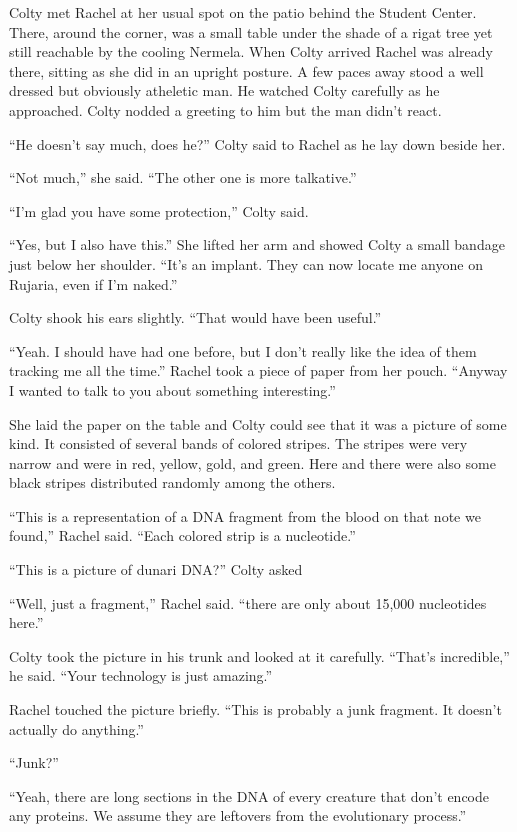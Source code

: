 
Colty met Rachel at her usual spot on the patio behind the Student Center. There, around the
corner, was a small table under the shade of a rigat tree yet still reachable by the cooling
Nermela. When Colty arrived Rachel was already there, sitting as she did in an upright posture.
A few paces away stood a well dressed but obviously atheletic man. He watched Colty carefully as
he approached. Colty nodded a greeting to him but the man didn't react.

``He doesn't say much, does he?'' Colty said to Rachel as he lay down beside her.

``Not much,'' she said. ``The other one is more talkative.''

``I'm glad you have some protection,'' Colty said.

``Yes, but I also have this.'' She lifted her arm and showed Colty a small bandage just below
her shoulder. ``It's an implant. They can now locate me anyone on Rujaria, even if I'm naked.''

Colty shook his ears slightly. ``That would have been useful.''

``Yeah. I should have had one before, but I don't really like the idea of them tracking me all
the time.'' Rachel took a piece of paper from her pouch. ``Anyway I wanted to talk to you about
something interesting.''

She laid the paper on the table and Colty could see that it was a picture of some kind. It
consisted of several bands of colored stripes. The stripes were very narrow and were in red,
yellow, gold, and green. Here and there were also some black stripes distributed randomly among
the others.

``This is a representation of a DNA fragment from the blood on that note we found,'' Rachel
said. ``Each colored strip is a nucleotide.''

``This is a picture of dunari DNA?'' Colty asked

``Well, just a fragment,'' Rachel said. ``there are only about 15,000 nucleotides here.''

Colty took the picture in his trunk and looked at it carefully. ``That's incredible,'' he said.
``Your technology is just amazing.''

Rachel touched the picture briefly. ``This is probably a junk fragment. It doesn't actually do
anything.''

``Junk?''

``Yeah, there are long sections in the DNA of every creature that don't encode any proteins. We
assume they are leftovers from the evolutionary process.''

